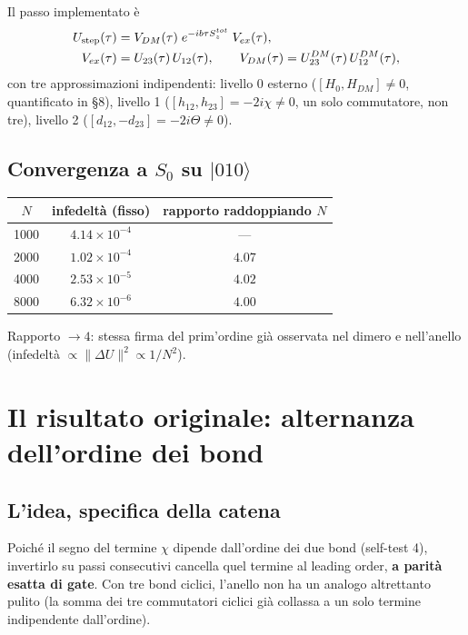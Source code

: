 \documentclass[11pt,a4paper]{article}
\newcommand{\ket}[1]{\lvert #1 \rangle}
\begin{document}
Il passo implementato è
\begin{align}
U_{\rm step}(\tau) &= V_{DM}(\tau)\;e^{-ib\tau S_z^{tot}}\;V_{ex}(\tau), \label{eq:Ustep}\\
V_{ex}(\tau)&=U_{23}(\tau)\,U_{12}(\tau), \qquad V_{DM}(\tau)=U_{23}^{DM}(\tau)\,U_{12}^{DM}(\tau), \notag
\end{align}
con tre approssimazioni indipendenti: livello 0 esterno ($[H_0,H_{DM}]\neq0$, quantificato in \texttt{} \S8), livello 1 ($[h_{12},h_{23}]=-2i\chi\neq0$, un solo commutatore, non tre), livello 2 ($[d_{12},-d_{23}]=-2i\Theta\neq0$).

\subsection{Convergenza a $S_0$ su $\ket{010}$}

\begin{center}
\begin{tabular}{@{}ccc@{}}
\toprule
$N$ & infedeltà (fisso) & rapporto raddoppiando $N$ \\
\midrule
1000 & $4.14\times10^{-4}$ & --- \\
2000 & $1.02\times10^{-4}$ & $4.07$ \\
4000 & $2.53\times10^{-5}$ & $4.02$ \\
8000 & $6.32\times10^{-6}$ & $4.00$ \\
\bottomrule
\end{tabular}
\end{center}
Rapporto $\to4$: stessa firma del prim'ordine già osservata nel dimero e nell'anello (infedeltà $\propto\|\Delta U\|^2\propto1/N^2$).

\section{Il risultato originale: alternanza dell'ordine dei bond}
\label{sec:alternanza}

\subsection{L'idea, specifica della catena}

Poiché il segno del termine $\chi$ dipende dall'ordine dei due bond (self-test 4), invertirlo su passi consecutivi cancella quel termine al leading order, \textbf{a parità esatta di gate}. Con tre bond ciclici, l'anello non ha un analogo altrettanto pulito (la somma dei tre commutatori ciclici già collassa a un solo termine indipendente dall'ordine).
\end{document}
